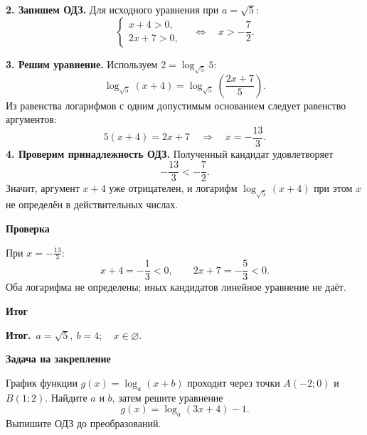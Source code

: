 \documentclass[a4paper,12pt]{article}
\newcommand{\reviewlabel}[1]{\par\smallskip\textbf{\color{accent}#1}\par\nobreak}
\newcommand{\resulttext}{\textbf{\color{accent}Итог.}\ }
\begin{document}
\textbf{2. Запишем ОДЗ.} Для исходного уравнения при $a=\sqrt5$:
\[
\begin{cases}x+4>0,\\2x+7>0,\end{cases}
\quad\Longleftrightarrow\quad x>-\frac72.
\]

\textbf{3. Решим уравнение.} Используем $2=\log_{\sqrt5}5$:
\[
\log_{\sqrt5}(x+4)=\log_{\sqrt5}\!\left(\frac{2x+7}{5}\right).
\]
Из равенства логарифмов с одним допустимым основанием следует равенство аргументов:
\[
5(x+4)=2x+7
\quad\Longrightarrow\quad x=-\frac{13}{3}.
\]
\textbf{4. Проверим принадлежность ОДЗ.} Полученный кандидат удовлетворяет
\[
-\frac{13}{3}<-\frac72.
\]
Значит, аргумент $x+4$ уже отрицателен, и логарифм $\log_{\sqrt5}(x+4)$ при этом $x$ не определён в действительных числах.
\reviewlabel{Проверка}
При $x=-\frac{13}{3}$:
\[
x+4=-\frac13<0,\qquad 2x+7=-\frac53<0.
\]
Оба логарифма не определены; иных кандидатов линейное уравнение не даёт.
\reviewlabel{Итог}
\resulttext $\boxed{a=\sqrt5,\ b=4;\quad x\in\varnothing.}$
\reviewlabel{Задача на закрепление}
График функции $g(x)=\log_a(x+b)$ проходит через точки $A(-2;0)$ и $B(1;2)$. Найдите $a$ и $b$, затем решите уравнение
\[
g(x)=\log_a(3x+4)-1.
\]
Выпишите ОДЗ до преобразований.
\end{document}
